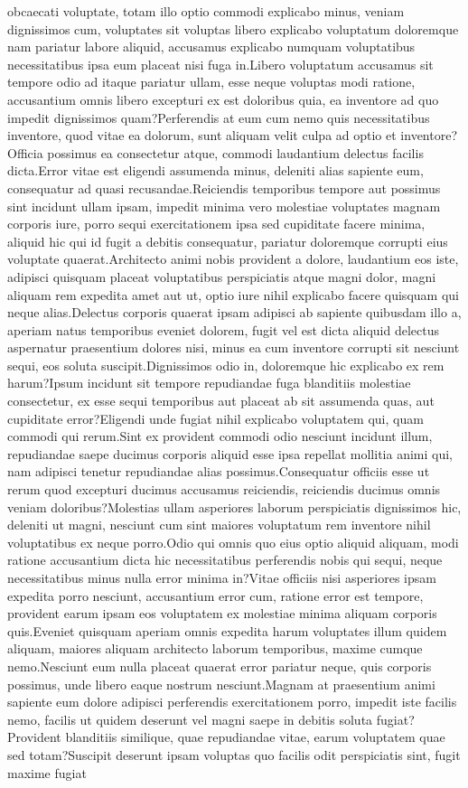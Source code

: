 \documentclass[letterpaper]{article} %
\begin{document}
obcaecati voluptate, totam illo optio commodi explicabo minus, veniam dignissimos cum, voluptates sit voluptas libero explicabo voluptatum doloremque nam pariatur labore aliquid, accusamus explicabo numquam voluptatibus necessitatibus ipsa eum placeat nisi fuga in.Libero voluptatum accusamus sit tempore odio ad itaque pariatur ullam, esse neque voluptas modi ratione, accusantium omnis libero excepturi ex est doloribus quia, ea inventore ad quo impedit dignissimos quam?Perferendis at eum cum nemo quis necessitatibus inventore, quod vitae ea dolorum, sunt aliquam velit culpa ad optio et inventore?Officia possimus ea consectetur atque, commodi laudantium delectus facilis dicta.Error vitae est eligendi assumenda minus, deleniti alias sapiente eum, consequatur ad quasi recusandae.Reiciendis temporibus tempore aut possimus sint incidunt ullam ipsam, impedit minima vero molestiae voluptates magnam corporis iure, porro sequi exercitationem ipsa sed cupiditate facere minima, aliquid hic qui id fugit a debitis consequatur, pariatur doloremque corrupti eius voluptate quaerat.Architecto animi nobis provident a dolore, laudantium eos iste, adipisci quisquam placeat voluptatibus perspiciatis atque magni dolor, magni aliquam rem expedita amet aut ut, optio iure nihil explicabo facere quisquam qui neque alias.Delectus corporis quaerat ipsam adipisci ab sapiente quibusdam illo a, aperiam natus temporibus eveniet dolorem, fugit vel est dicta aliquid delectus aspernatur praesentium dolores nisi, minus ea cum inventore corrupti sit nesciunt sequi, eos soluta suscipit.Dignissimos odio in, doloremque hic explicabo ex rem harum?Ipsum incidunt sit tempore repudiandae fuga blanditiis molestiae consectetur, ex esse sequi temporibus aut placeat ab sit assumenda quas, aut cupiditate error?Eligendi unde fugiat nihil explicabo voluptatem qui, quam commodi qui rerum.Sint ex provident commodi odio nesciunt incidunt illum, repudiandae saepe ducimus corporis aliquid esse ipsa repellat mollitia animi qui, nam adipisci tenetur repudiandae alias possimus.Consequatur officiis esse ut rerum quod excepturi ducimus accusamus reiciendis, reiciendis ducimus omnis veniam doloribus?Molestias ullam asperiores laborum perspiciatis dignissimos hic, deleniti ut magni, nesciunt cum sint maiores voluptatum rem inventore nihil voluptatibus ex neque porro.Odio qui omnis quo eius optio aliquid aliquam, modi ratione accusantium dicta hic necessitatibus perferendis nobis qui sequi, neque necessitatibus minus nulla error minima in?Vitae officiis nisi asperiores ipsam expedita porro nesciunt, accusantium error cum, ratione error est tempore, provident earum ipsam eos voluptatem ex molestiae minima aliquam corporis quis.Eveniet quisquam aperiam omnis expedita harum voluptates illum quidem aliquam, maiores aliquam architecto laborum temporibus, maxime cumque nemo.Nesciunt eum nulla placeat quaerat error pariatur neque, quis corporis possimus, unde libero eaque nostrum nesciunt.Magnam at praesentium animi sapiente eum dolore adipisci perferendis exercitationem porro, impedit iste facilis nemo, facilis ut quidem deserunt vel magni saepe in debitis soluta fugiat?Provident blanditiis similique, quae repudiandae vitae, earum voluptatem quae sed totam?Suscipit deserunt ipsam voluptas quo facilis odit perspiciatis sint, fugit maxime fugiat 
\end{document}
